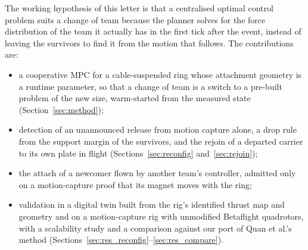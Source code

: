 The working hypothesis of this letter is that a centralised optimal control problem suits a change of team because
the planner solves for the force distribution of the team it actually has in the first tick after the event,
instead of leaving the survivors to find it from the motion that follows. The contributions are:
\begin{itemize}
  \item a cooperative MPC for a cable-suspended ring whose attachment geometry is a runtime parameter, so that a
  change of team is a switch to a pre-built problem of the new size, warm-started from the measured state
  (Section~\ref{sec:method});
  \item detection of an unannounced release from motion capture alone, a drop rule from the support margin of the
  survivors, and the rejoin of a departed carrier to its own plate in flight (Sections~\ref{sec:reconfig}
  and~\ref{sec:rejoin});
  \item the attach of a newcomer flown by another team's controller, admitted only on a motion-capture proof that its
  magnet moves with the ring;
  \item validation in a digital twin built from the rig's identified thrust map and geometry and on a
  motion-capture rig with unmodified Betaflight quadrotors, with a scalability study and a comparison against our
  port of Quan et al.'s method \cite{quan2025swarm} (Sections~\ref{sec:res_reconfig}--\ref{sec:res_compare}).
\end{itemize}
